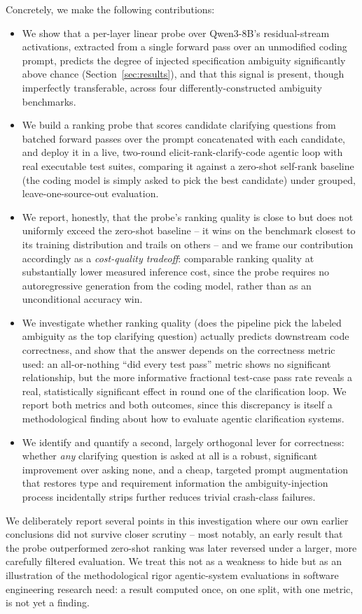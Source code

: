 Concretely, we make the following contributions:

\begin{itemize}
\item We show that a per-layer linear probe over Qwen3-8B's residual-stream
activations, extracted from a single forward pass over an unmodified coding
prompt, predicts the degree of injected specification ambiguity
significantly above chance (Section~\ref{sec:results}), and that this
signal is present, though imperfectly transferable, across four
differently-constructed ambiguity benchmarks.
\item We build a ranking probe that scores candidate clarifying questions
from batched forward passes over the prompt concatenated with each
candidate, and deploy it in a live, two-round elicit-rank-clarify-code
agentic loop with real executable test suites, comparing it against a
zero-shot self-rank baseline (the coding model is simply asked to pick the
best candidate) under grouped, leave-one-source-out evaluation.
\item We report, honestly, that the probe's ranking quality is
close to but does not uniformly exceed the zero-shot baseline -- it
wins on the benchmark closest to its training distribution and trails on
others -- and we frame our contribution accordingly as a
\emph{cost-quality tradeoff}: comparable ranking quality at substantially
lower measured inference cost, since the probe requires no autoregressive
generation from the coding model, rather than as an unconditional accuracy
win.
\item We investigate whether ranking quality (does the pipeline pick the
labeled ambiguity as the top clarifying question) actually predicts
downstream code correctness, and show that the answer depends on the
correctness metric used: an all-or-nothing ``did every test pass'' metric
shows no significant relationship, but the more informative fractional
test-case pass rate reveals a real, statistically significant effect in
round one of the clarification loop. We report both metrics and both
outcomes, since this discrepancy is itself a methodological finding about
how to evaluate agentic clarification systems.
\item We identify and quantify a second, largely orthogonal lever for
correctness: whether \emph{any} clarifying question is asked at all is a
robust, significant improvement over asking none, and a cheap,
targeted prompt augmentation that restores type and requirement information
the ambiguity-injection process incidentally strips further reduces
trivial crash-class failures.
\end{itemize}

We deliberately report several points in this investigation where our own
earlier conclusions did not survive closer scrutiny -- most notably, an
early result that the probe outperformed zero-shot ranking was later
reversed under a larger, more carefully filtered evaluation. We treat this
not as a weakness to hide but as an illustration of the methodological
rigor agentic-system evaluations in software engineering research need: a
result computed once, on one split, with one metric, is not yet a finding.
